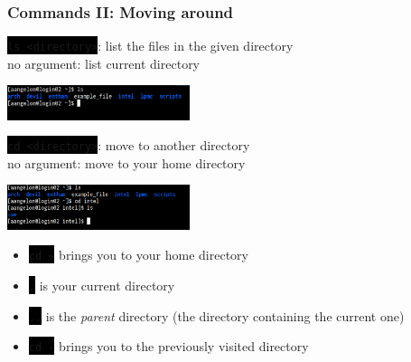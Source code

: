 \documentclass[unknownkeysallowed, 10pt, a4 paper, handout]{beamer}
\newcommand{\code}[1]{\colorbox{black}{\color{green}\texttt{#1}}}
\begin{document}
\begin{frame}[c]
  \begin{center}
    \frametitle{Commands II: Moving around}

    \code{ls <directory>}: list the files in the given directory\\
    no argument: list current directory
    \vspace{-2mm}

    \begin{center}
      \includegraphics[width=0.40\textwidth]{pics/ls.png}
    \end{center}

    \code{cd <directory>}: move to another directory\\
    no argument: move to your home directory
    \vspace{-2mm}

    \begin{center}
      \includegraphics[width=0.40\textwidth]{pics/cd.png}
    \end{center}

    \vspace{-4mm}

    \begin{itemize}
      \item \code{cd \~} brings you to your home directory
      \item \code{.} is your current directory
      \item \code{..} is the \textit{parent} directory (the directory containing the current one)
      \item \code{cd -} brings you to the previously visited directory
    \end{itemize}
  \end{center}
\end{frame}
\end{document}
